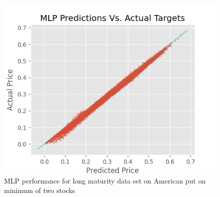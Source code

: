 \begin{figure}[th]
\centering
\includegraphics{Figures/longTAmerMinP.png}
\decoRule
\caption[MLP Performance for Long Maturity Data Set Bivariate American Contingent Claim]{MLP performance for long maturity data set on American put on minimum of two stocks}
\label{fig:MLPsAmerMin1}
\end{figure}






